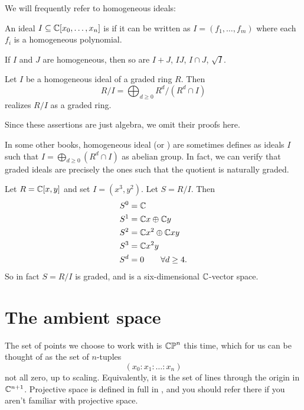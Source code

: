 We will frequently refer to homogeneous ideals:
\begin{definition}
	An ideal $I \subseteq \mathbb C[x_0, \dots, x_n]$ is 
	if it can be written as $I = (f_1, \dots, f_m)$
	where each $f_i$ is a homogeneous polynomial.
\end{definition}
\begin{remark}
	If $I$ and $J$ are homogeneous,
	then so are $I+J$, $IJ$, $I \cap J$, $\sqrt I$.
\end{remark}
\begin{lemma}
	Let $I$ be a homogeneous ideal of a graded ring $R$.
	Then
	\[ R/I = \bigoplus_{d \ge 0} R^d / (R^d \cap I) \]
	realizes $R/I$ as a graded ring.
\end{lemma}
Since these assertions are just algebra,
we omit their proofs here.
\begin{remark}
	In some other books, homogeneous ideal (or ) are sometimes defines as ideals $I$
	such that $I = \bigoplus_{d \ge 0} (R^d \cap I)$ as abelian group.
	In fact, we can verify that graded ideals are precisely the ones such that the quotient is naturally graded.
\end{remark}
\begin{example}
	Let $R = \mathbb C[x,y]$ and set $I = (x^3, y^2)$.
	Let $S = R/I$. Then
	\begin{align*}
		S^0 &= \mathbb C \\
		S^1 &= \mathbb C x \oplus \mathbb C y \\
		S^2 &= \mathbb C x^2 \oplus \mathbb C xy \\
		S^3 &= \mathbb C x^2y \\
		S^d &= 0 \qquad \forall d \ge 4.
	\end{align*}
	So in fact $S = R/I$ is graded,
	and is a six-dimensional $\mathbb C$-vector space.
\end{example}


\section{The ambient space}
The set of points we choose to work with is $\mathbb{CP}^n$ this time,
which for us can be thought of as the set of $n$-tuples
\[ \left( x_0 : x_1 : \dots : x_n \right) \]
not all zero, up to scaling.
Equivalently, it is the set of lines through the origin in $\mathbb C^{n+1}$.
Projective space is defined in full in ,
and you should refer there if you aren't familiar with projective space.

